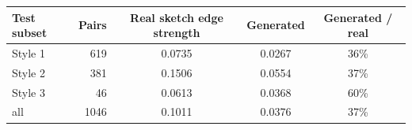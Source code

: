 \begin{tabular}{lrccc}
\toprule
Test subset & Pairs & Real sketch edge strength & Generated & Generated / real \\
\midrule
Style 1 & 619 & 0.0735 & 0.0267 & 36\% \\
Style 2 & 381 & 0.1506 & 0.0554 & 37\% \\
Style 3 & 46 & 0.0613 & 0.0368 & 60\% \\
\midrule
all & 1046 & 0.1011 & 0.0376 & 37\% \\
\bottomrule
\end{tabular}
